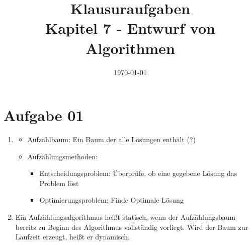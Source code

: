 \documentclass[10pt,a4paper]{article}
\begin{document}
\title{Klausuraufgaben \\
\small{Kapitel 7 - Entwurf von Algorithmen}}
\author{}
\date{\today}
\maketitle

\section*{Aufgabe 01}
    \begin{enumerate}[label={\alph*)}]
        \item
            \begin{itemize}
                \item Aufz\"ahlbaum: Ein Baum der alle L\"osungen
                    enth\"alt (?)
                \item Aufz\"ahlungsmethoden: \\
                    \begin{itemize}
                        \item Entscheidungsproblem: 
                            \"Uberpr\"ufe, ob eine 
                            gegebene L\"osung das
                            Problem l\"ost
                        \item Optimierungsproblem:
                            Finde Optimale L\"osung
                    \end{itemize}

            \end{itemize}

        \item Ein Aufz\"ahlungsalgorithmus hei\ss t statisch, wenn der
            Aufz\"ahlungsbaum bereits zu Beginn des Algorithmus vollst\"andig 
            vorliegt. Wird der Baum zur Laufzeit erzeugt, hei\ss t er dynamisch.
    \end{enumerate}
    
\end{document}
